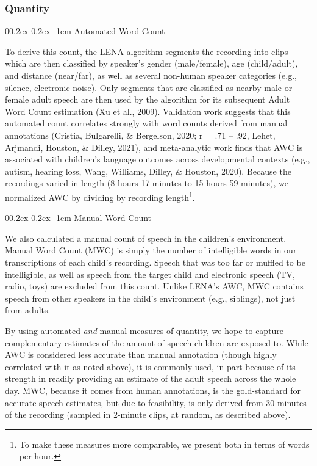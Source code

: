 \documentclass[
  man]{apa6}
\makeatletter
\let\oldparagraph\paragraph
\renewcommand{\paragraph}[1]{\oldparagraph{#1}\mbox{}}
\renewcommand{\paragraph}{\@startsection{paragraph}{4}{\parindent}%
  {0\baselineskip \@plus 0.2ex \@minus 0.2ex}%
  {-1em}%
  {\normalfont\normalsize\bfseries\itshape\typesectitle}}
\makeatother
\begin{document}
\hypertarget{quantity}{%
\subsubsection{Quantity}\label{quantity}}

\hypertarget{automated-word-count}{%
\paragraph{Automated Word Count}\label{automated-word-count}}

To derive this count, the LENA algorithm segments the recording into clips which are then classified by speaker's gender (male/female), age (child/adult), and distance (near/far), as well as several non-human speaker categories (e.g., silence, electronic noise). Only segments that are classified as nearby male or female adult speech are then used by the algorithm for its subsequent Adult Word Count estimation (Xu et al., 2009). Validation work suggests that this automated count correlates strongly with word counts derived from manual annotations (Cristia, Bulgarelli, \& Bergelson, 2020; r = .71 -- .92, Lehet, Arjmandi, Houston, \& Dilley, 2021), and meta-analytic work finds that AWC is associated with children's language outcomes across developmental contexts (e.g., autism, hearing loss, Wang, Williams, Dilley, \& Houston, 2020). Because the recordings varied in length (8 hours 17 minutes to 15 hours 59 minutes), we normalized AWC by dividing by recording length\footnote{To make these measures more comparable, we present both in terms of words per hour.}.

\hypertarget{manual-word-count}{%
\paragraph{Manual Word Count}\label{manual-word-count}}

We also calculated a manual count of speech in the children's environment. Manual Word Count (MWC) is simply the number of intelligible words in our transcriptions of each child's recording. Speech that was too far or muffled to be intelligible, as well as speech from the target child and electronic speech (TV, radio, toys) are excluded from this count. Unlike LENA's AWC, MWC contains speech from other speakers in the child's environment (e.g., siblings), not just from adults.

By using automated \emph{and} manual measures of quantity, we hope to capture complementary estimates of the amount of speech children are exposed to. While AWC is considered less accurate than manual annotation (though highly correlated with it as noted above), it is commonly used, in part because of its strength in readily providing an estimate of the adult speech across the whole day. MWC, because it comes from human annotations, is the gold-standard for accurate speech estimates, but due to feasibility, is only derived from 30 minutes of the recording (sampled in 2-minute clips, at random, as described above).
\end{document}
